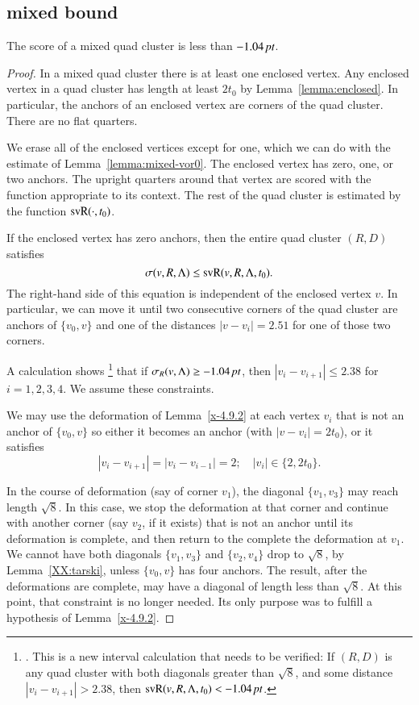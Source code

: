 \subsection{mixed bound} %

\begin{lemma} \label{lemma:1.04}
The score of a mixed quad cluster is less than $-1.04\,\hbox{\it pt}$.
\end{lemma}

\begin{proof}
In a mixed quad cluster there is at least one enclosed vertex.
Any enclosed vertex in a quad cluster has length at least $2t_0$
by Lemma~\ref{lemma:enclosed}. In particular, the anchors of an
enclosed vertex are corners of the quad cluster. There are no flat
quarters.

We erase all of the enclosed vertices except for one, which
we can do with the estimate of Lemma~\ref{lemma:mixed-vor0}.
The enclosed vertex has zero, one, or two anchors.  The upright
quarters around that vertex are scored with the function appropriate
to its context.
The rest of the quad cluster is estimated by the function ${\operatorname{svR}}(\cdot,t_0)$.

If the enclosed vertex has zero anchors, then the entire quad
cluster $(R,D)$ satisfies $$\sigma(v,R,\Lambda)\le {\operatorname{svR}}(v,R,\Lambda,t_0).$$
The right-hand side of this equation is independent of the enclosed
vertex $v$.  In particular, we can move it until 
two consecutive  corners of the quad cluster are anchors of $\{v_0,v\}$
and one of the distances $|v-v_i|=2.51$ for one of those two corners.

A calculation shows%
\footnote{. This is a new interval calculation that
needs to be verified: If $(R,D)$ is any quad cluster with both
diagonals greater than $\sqrt8$, and some distance $|v_i-v_{i+1}|>2.38$,
then ${\operatorname{svR}}(v,R,\Lambda,t_0) < -1.04\,\hbox{\it pt}$.} 
that if $\sigma_R(v,\Lambda) \ge -1.04\,\hbox{\it pt}$, then 
$|v_i-v_{i+1}|\le 2.38$ for $i=1,2,3,4$.  We assume these
constraints.

We may use the deformation of Lemma~\ref{x-4.9.2}
at each vertex $v_i$ that is not an anchor of $\{v_0,v\}$ so either
it becomes an anchor (with $|v-v_i|=2t_0$), or it satisfies
  $$|v_i-v_{i+1}|=|v_i-v_{i-1}|=2;\quad |v_i|\in\{2,2t_0\}.$$ 

In the course of deformation (say of corner $v_1$),  
the diagonal $\{v_1,v_3\}$ may reach length $\sqrt8$.  
In this case, we stop
the deformation at that corner and continue with another
corner (say $v_2$, if it exists)
that is not an anchor until its deformation
is complete, and then return to the complete the deformation
at $v_1$.  We cannot have both diagonals $\{v_1,v_3\}$ and $\{v_2,v_4\}$
drop to $\sqrt8$, by Lemma~\ref{XX:tarski}, unless $\{v_0,v\}$ has four
anchors.  The result, after the deformations are complete, may
have a diagonal of length less than $\sqrt8$.  At this point,
that constraint is no longer needed.  Its only purpose was to
fulfill a hypothesis of Lemma~\ref{x-4.9.2}.


\end{proof}
